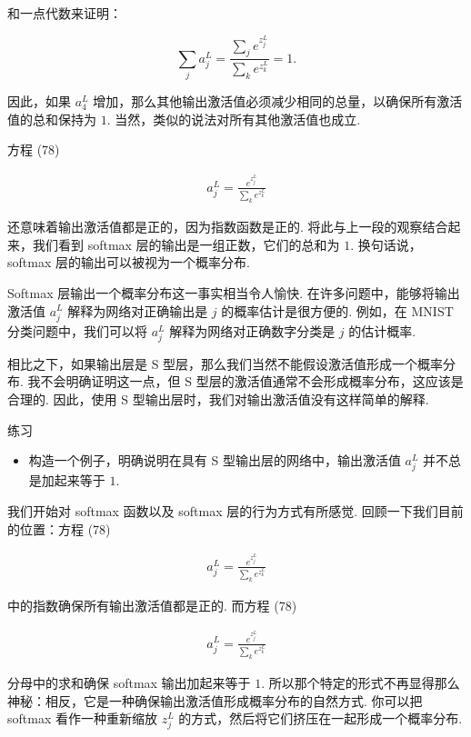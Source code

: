 \noindent 和一点代数来证明：

\begin{equation}
\sum_j a^L_j = \frac{\sum_j e^{z^L_j}}{\sum_k e^{z^L_k}} = 1.
\tag{79}
\end{equation}

\noindent 因此，如果 $a^L_4$ 增加，那么其他输出激活值必须减少相同的总量，以确保所有激活值的总和保持为 $1$. 当然，类似的说法对所有其他激活值也成立.

方程 (78)

\begin{align*}
a^L_j = \frac{e^{z^L_j}}{\sum_k e^{z^L_k}} \nonumber
\end{align*}

\noindent 还意味着输出激活值都是正的，因为指数函数是正的. 将此与上一段的观察结合起来，我们看到 softmax 层的输出是一组正数，它们的总和为 $1$. 换句话说，softmax 层的输出可以被视为一个概率分布.

Softmax 层输出一个概率分布这一事实相当令人愉快. 在许多问题中，能够将输出激活值 $a^L_j$ 解释为网络对正确输出是 $j$ 的概率估计是很方便的. 例如，在 MNIST 分类问题中，我们可以将 $a^L_j$ 解释为网络对正确数字分类是 $j$ 的估计概率.

相比之下，如果输出层是 S 型层，那么我们当然不能假设激活值形成一个概率分布. 我不会明确证明这一点，但 S 型层的激活值通常不会形成概率分布，这应该是合理的. 因此，使用 S 型输出层时，我们对输出激活值没有这样简单的解释.

\begin{exerciseBox}{练习}

\begin{itemize}

\item 构造一个例子，明确说明在具有 S 型输出层的网络中，输出激活值 $a^L_j$ 并不总是加起来等于 $1$.

\end{itemize}

我们开始对 softmax 函数以及 softmax 层的行为方式有所感觉. 回顾一下我们目前的位置：方程 (78)

\begin{align*}
a^L_j = \frac{e^{z^L_j}}{\sum_k e^{z^L_k}} \nonumber
\end{align*}

\noindent 中的指数确保所有输出激活值都是正的. 而方程 (78)

\begin{align*}
a^L_j = \frac{e^{z^L_j}}{\sum_k e^{z^L_k}} \nonumber
\end{align*}

\noindent 分母中的求和确保 softmax 输出加起来等于 $1$. 所以那个特定的形式不再显得那么神秘：相反，它是一种确保输出激活值形成概率分布的自然方式. 你可以把 softmax 看作一种重新缩放 $z^L_j$ 的方式，然后将它们挤压在一起形成一个概率分布.

\end{exerciseBox}

